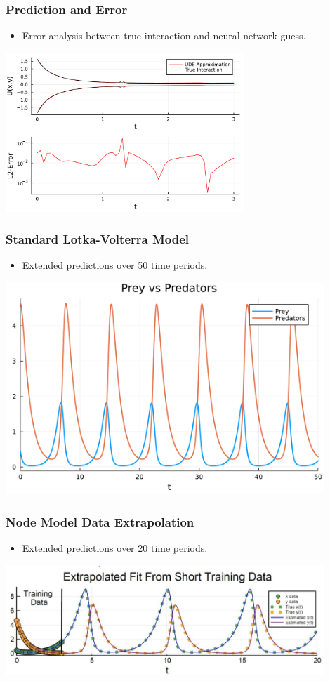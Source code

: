 \documentclass[aspectratio=169]{beamer}
\begin{document}
\begin{frame}
  \frametitle{Prediction and Error}
  \begin{itemize}
    \item Error analysis between true interaction and neural network guess.
  \end{itemize}
  \begin{center}
        \includegraphics[width=9cm, height=6cm]{plots/Ideal_Data__missingterm_reconstruction_and_error.pdf}
  \end{center}
\end{frame}

\begin{frame}
  \frametitle{Standard Lotka-Volterra Model}
  \begin{itemize}
    \item Extended predictions over 50 time periods.
  \end{itemize}
  \includegraphics[width=12cm]{plots/algae_vs_predators.pdf}
\end{frame}

\begin{frame}
  \frametitle{Node Model Data Extrapolation}
  \begin{itemize}
    \item Extended predictions over 20 time periods.
  \end{itemize}
  \includegraphics[width=12cm]{plots/Extrapolated_fit.png}
\end{frame}
\end{document}
